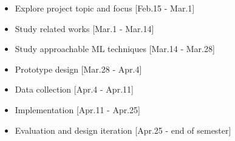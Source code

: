 \begin{itemize}
\item Explore project topic and focus [Feb.15 - Mar.1]
\item Study related works [Mar.1 - Mar.14]
\item Study approachable ML techniques [Mar.14 - Mar.28]
\item Prototype design [Mar.28 - Apr.4]
\item Data collection [Apr.4 - Apr.11]
\item Implementation [Apr.11 - Apr.25]
\item Evaluation and design iteration [Apr.25 - end of semester]
\end{itemize}

